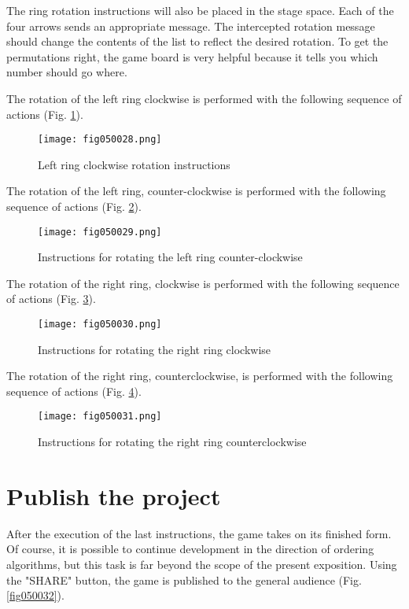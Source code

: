 The ring rotation instructions will also be placed in the stage space. Each of the four arrows sends an appropriate message. The intercepted rotation message should change the contents of the list to reflect the desired rotation. To get the permutations right, the game board is very helpful because it tells you which number should go where.

The rotation of the left ring clockwise is performed with the following sequence of actions (Fig. \ref{fig050028}).

\begin{figure}[H]
   \centering
   \texttt{[image: fig050028.png]}
   \caption{Left ring clockwise rotation instructions}
\label{fig050028}
\end{figure}

The rotation of the left ring, counter-clockwise is performed with the following sequence of actions (Fig. \ref{fig050029}).

\begin{figure}[H]
   \centering
   \texttt{[image: fig050029.png]}
   \caption{Instructions for rotating the left ring counter-clockwise}
\label{fig050029}
\end{figure}

The rotation of the right ring, clockwise is performed with the following sequence of actions (Fig. \ref{fig050030}).

\begin{figure}[H]
   \centering
   \texttt{[image: fig050030.png]}
   \caption{Instructions for rotating the right ring clockwise}
\label{fig050030}
\end{figure}

The rotation of the right ring, counterclockwise, is performed with the following sequence of actions (Fig. \ref{fig050031}).

\begin{figure}[H]
   \centering
   \texttt{[image: fig050031.png]}
   \caption{Instructions for rotating the right ring counterclockwise}
\label{fig050031}
\end{figure}

\section{Publish the project}

After the execution of the last instructions, the game takes on its finished form. Of course, it is possible to continue development in the direction of ordering algorithms, but this task is far beyond the scope of the present exposition. Using the "SHARE" button, the game is published to the general audience (Fig. \ref{fig050032}).


